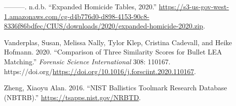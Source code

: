 \begin{CSLReferences}{1}{0}
\leavevmode{}%
---------. n.d.b. {``{Expanded Homicide Tables, 2020}.''} \url{https://s3-us-gov-west-1.amazonaws.com/cg-d4b776d0-d898-4153-90c8-8336f86bdfec/CIUS/downloads/2020/expanded-homicide-2020.zip}.

\leavevmode{}%
Vanderplas, Susan, Melissa Nally, Tylor Klep, Cristina Cadevall, and Heike Hofmann. 2020. {``Comparison of Three Similarity Scores for Bullet LEA Matching.''} \emph{Forensic Science International} 308: 110167. https://doi.org/\url{https://doi.org/10.1016/j.forsciint.2020.110167}.

\leavevmode{}%
Zheng, Xiaoyu Alan. 2016. {``{NIST Ballistics Toolmark Research Database (NBTRB)}.''} \url{https://tsapps.nist.gov/NRBTD}.

\end{CSLReferences}



\address{%
Wangqian Ju\\
Department of Statistics\\%
Center for Statistics and Applications in Forensic Evidence\\ Iowa State University\\ 2438 Osborn Dr\\ Ames, IA 50011\\
%
\url{https://github.com/willju-wangqian}\\%
\textit{ORCiD: \href{https://orcid.org/0000-0002-9977-377X}{0000-0002-9977-377X}}\\%
\href{mailto:wju@iastate.edu}{\nolinkurl{wju@iastate.edu}}%
}

\address{%
Heike Hofmann\\
Department of Statistics\\%
Center for Statistics and Applications in Forensic Evidence\\ Iowa State University\\ 2438 Osborn Dr\\ Ames, IA 50011\\
%
\url{https://github.com/heike}\\%
\textit{ORCiD: \href{https://orcid.org/0000-0002-9079-593X}{0000-0002-9079-593X}}\\%
\href{mailto:hofmann@iastate.edu}{\nolinkurl{hofmann@iastate.edu}}%
}
